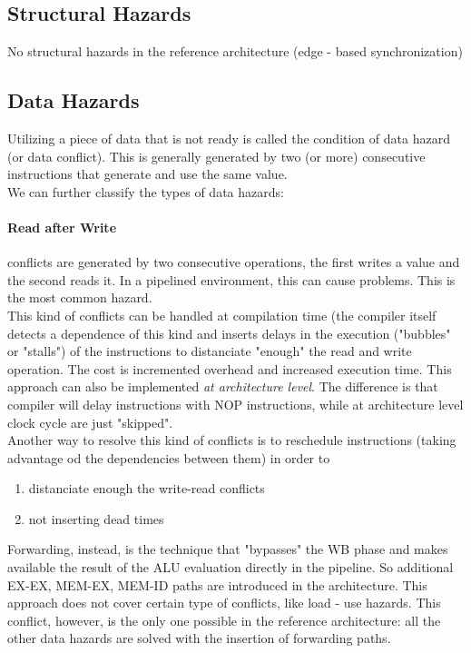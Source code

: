 \documentclass[10pt,a4paper]{article}
\begin{document}
			\subsection{Structural Hazards}
				No structural hazards in the reference architecture (edge - based synchronization)
				
			\subsection{Data Hazards}
				Utilizing a piece of data that is not ready is called the condition of data hazard (or data conflict). This is generally generated by two (or more) consecutive instructions that generate and use the same value.\\
				We can further classify the types of data hazards:
				
				\paragraph{Read after Write} 
					conflicts are generated by two consecutive operations, the first writes a value and the second reads it. In a pipelined environment, this can cause problems. This is the most common hazard.\\
					This kind of conflicts can be handled at compilation time (the compiler itself detects a dependence of this kind and inserts delays in the execution ("bubbles" or "stalls") of the instructions to distanciate "enough" the read and write operation. The cost is incremented overhead and increased execution time. This approach can also be implemented \emph{at architecture level}. The difference is that compiler will delay instructions with NOP instructions, while at architecture level clock cycle are just "skipped".\\
					Another way to resolve this kind of conflicts is to reschedule instructions (taking advantage od the dependencies between them) in order to 
					\begin{enumerate}
						\item distanciate enough the write-read conflicts
						\item not inserting dead times
					\end{enumerate}
					Forwarding, instead, is the technique that "bypasses" the WB phase and makes available the result of the ALU evaluation directly in the pipeline. So additional EX-EX, MEM-EX, MEM-ID paths are introduced in the architecture. This approach does not cover certain type of conflicts, like load - use hazards. This conflict, however, is the only one possible in the reference architecture: all the other data hazards are solved with the insertion of forwarding paths.
				
\end{document}
